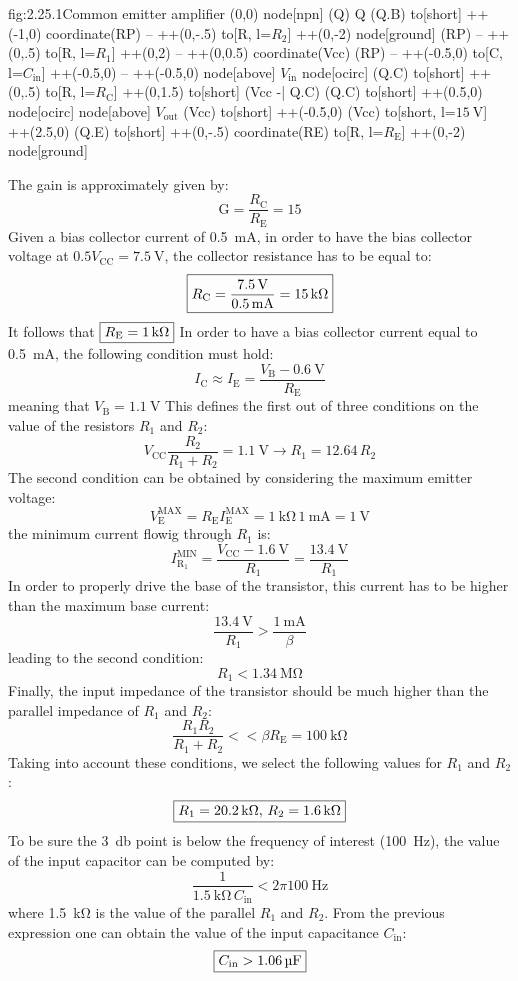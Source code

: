 \begin{circuit}{fig:2.25.1}{Common emitter amplifier}
    (0,0) node[npn] (Q) {Q}
    (Q.B) to[short] ++(-1,0) coordinate(RP)
    -- ++(0,-.5) 
    to[R, l=$R_2$] ++(0,-2)
    node[ground] {}
    (RP) -- ++(0,.5)
    to[R, l=$R_1$] ++(0,2)
    -- ++(0,0.5) coordinate(Vcc)
    (RP) -- ++(-0.5,0)
    to[C, l=$C_\text{in}$] ++(-0.5,0)
    -- ++(-0.5,0)
    node[above] {$V_\text{in}$}
    node[ocirc] {}
    (Q.C) to[short] ++(0,.5)
    to[R, l=$R_\text{C}$] ++(0,1.5)
    to[short] (Vcc -| Q.C)
    (Q.C) to[short] ++(0.5,0)
    node[ocirc] {}
    node[above] {$V_\text{out}$}
    (Vcc) to[short] ++(-0.5,0)
    (Vcc) to[short, l=$\SI{15}{\volt}$] ++(2.5,0)
    (Q.E) to[short] ++(0,-.5) coordinate(RE)
    to[R, l=$R_\text{E}$] ++(0,-2)
    node[ground] {}
\end{circuit}
The gain is approximately given by:
\[\text{G}=\frac{R_\text{C}}{R_\text{E}}=15\]
Given a bias collector current of \SI{0.5}{\milli\ampere}, in order to have the bias collector voltage at $0.5V_\text{CC}=\SI{7.5}{\volt}$, the collector resistance has to be equal to:
\[\boxed{R_\text{C}=\frac{\SI{7.5}{\volt}}{\SI{0.5}{\milli\ampere}}=\SI{15}{\kilo\ohm}}\]
It follows that $\boxed{R_\text{E}=\SI{1}{\kilo\ohm}}$
In order to have a bias collector current equal to \SI{0.5}{\milli\ampere}, the following condition must hold:
\[I_\text{C}\approx I_\text{E}=\frac{V_\text{B}-\SI{0.6}{\volt}}{R_\text{E}}\]
meaning that $V_\text{B}=\SI{1.1}{\volt}$
This defines the first out of three conditions on the value of the resistors $R_1$ and $R_2$:
\[V_\text{CC}\frac{R_2}{R_1+R_2}=\SI{1.1}{\volt}\rightarrow R_1 = 12.64\,R_2\]
The second condition can be obtained by considering the maximum emitter voltage:
\[V_\text{E}^\text{MAX}=R_\text{E}I_\text{E}^\text{MAX}=\SI{1}{\kilo\ohm}\,\SI{1}{\milli\ampere}=\SI{1}{\volt}\]
the minimum current flowig through $R_1$ is:
\[I_{\text{R}_1}^\text{MIN}=\frac{V_\text{CC}-\SI{1.6}{\volt}}{R_1}=\frac{\SI{13.4}{\volt}}{R_1}\]
In order to properly drive the base of the transistor, this current has to be higher than the maximum base current:
\[\frac{\SI{13.4}{\volt}}{R_1}>\frac{\SI{1}{\milli\ampere}}{\beta}\]
leading to the second condition:
\[R_1<\SI{1.34}{\mega\ohm}\]
Finally, the input impedance of the transistor should be much higher than the parallel impedance of $R_1$ and $R_2$:
\[\frac{R_1R_2}{R_1+R_2}<<\beta R_\text{E}=\SI{100}{\kilo\ohm}\]
Taking into account these conditions, we select the following values for $R_1$ and $R_2$:
\[\boxed{R_1=\SI{20.2}{\kilo\ohm},\,R_2=\SI{1.6}{\kilo\ohm}}\]
To be sure the \SI{3}{\decibel} point is below the frequency of interest (\SI{100}{\hertz}), the value of the input capacitor can be computed by:
\[\frac{1}{\SI{1.5}{\kilo\ohm}\,C_\text{in}}<2\pi\SI{100}{\hertz}\]
where \SI{1.5}{\kilo\ohm} is the value of the parallel $R_1$ and $R_2$.
From the previous expression one can obtain the value of the input capacitance $C_\text{in}$:
\[\boxed{C_\text{in}>\SI{1.06}{\micro\farad}}\]

